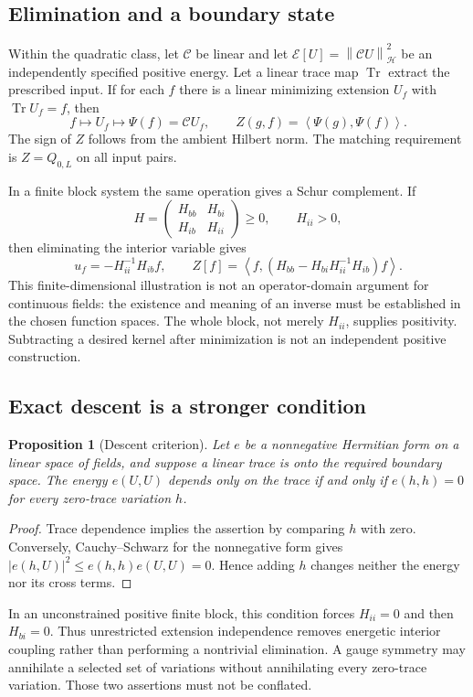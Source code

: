 \documentclass[11pt]{article}
\numberwithin{equation}{section}
\newtheorem{proposition}[theorem]{Proposition}
\theoremstyle{definition}
\theoremstyle{remark}
\newcommand{\norm}[1]{\left\lVert#1\right\rVert}
\newcommand{\ip}[2]{\left\langle#1,#2\right\rangle}
\begin{document}
\subsection{Elimination and a boundary state}
Within the quadratic class, let $\mathcal C$ be linear and let $\mathcal E[U]=\norm{\mathcal C U}_{\mathcal H}^2$ be an independently specified positive energy. Let a linear trace map $\operatorname{Tr}$ extract the prescribed input. If for each $f$ there is a linear minimizing extension $U_f$ with $\operatorname{Tr}U_f=f$, then
\begin{equation}
 f\longmapsto U_f\longmapsto\Psi(f)=\mathcal C U_f,
 \qquad Z(g,f)=\ip{\Psi(g)}{\Psi(f)}.
 \label{eq:bulkroute}
\end{equation}
The sign of $Z$ follows from the ambient Hilbert norm. The matching requirement is $Z=Q_{0,L}$ on all input pairs.

In a finite block system the same operation gives a Schur complement. If
\begin{equation}
 H=\begin{pmatrix}H_{bb}&H_{bi}\\H_{ib}&H_{ii}\end{pmatrix}\ge0,
 \qquad H_{ii}>0,
\end{equation}
then eliminating the interior variable gives
\begin{equation}
 u_f=-H_{ii}^{-1}H_{ib}f,
 \qquad Z[f]=\ip{f}{(H_{bb}-H_{bi}H_{ii}^{-1}H_{ib})f}.
\end{equation}
This finite-dimensional illustration is not an operator-domain argument for continuous fields: the existence and meaning of an inverse must be established in the chosen function spaces. The whole block, not merely $H_{ii}$, supplies positivity. Subtracting a desired kernel after minimization is not an independent positive construction.

\subsection{Exact descent is a stronger condition}
\begin{proposition}[Descent criterion]
\label{prop:descent}
Let $e$ be a nonnegative Hermitian form on a linear space of fields, and suppose a linear trace is onto the required boundary space. The energy $e(U,U)$ depends only on the trace if and only if $e(h,h)=0$ for every zero-trace variation $h$.
\end{proposition}
\begin{proof}
Trace dependence implies the assertion by comparing $h$ with zero. Conversely, Cauchy--Schwarz for the nonnegative form gives $|e(h,U)|^2\le e(h,h)e(U,U)=0$. Hence adding $h$ changes neither the energy nor its cross terms.
\end{proof}
In an unconstrained positive finite block, this condition forces $H_{ii}=0$ and then $H_{bi}=0$. Thus unrestricted extension independence removes energetic interior coupling rather than performing a nontrivial elimination. A gauge symmetry may annihilate a selected set of variations without annihilating every zero-trace variation. Those two assertions must not be conflated.
\end{document}
